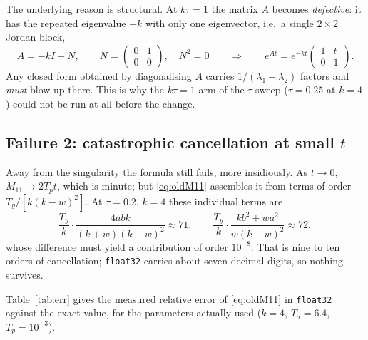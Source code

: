 \documentclass[11pt]{article}
\newcommand{\Tp}{T_p}
\newcommand{\Ta}{T_a}
\newcommand{\kk}{k}
\newcommand{\tauu}{\tau}
\begin{document}
The underlying reason is structural. At $\kk\tauu=1$ the matrix $A$ becomes
\emph{defective}: it has the repeated eigenvalue $-\kk$ with only one eigenvector, i.e.\ a
single $2\times2$ Jordan block,
\begin{equation}
A = -\kk I + N,\qquad N=\begin{pmatrix}0&1\\0&0\end{pmatrix},\quad N^{2}=0
\qquad\Longrightarrow\qquad
e^{At} = e^{-\kk t}\begin{pmatrix}1 & t\\ 0 & 1\end{pmatrix}.
\label{eq:jordan}
\end{equation}
Any closed form obtained by diagonalising $A$ carries $1/(\lambda_1-\lambda_2)$ factors and
\emph{must} blow up there. This is why the $\kk\tauu=1$ arm of the $\tauu$ sweep
($\tauu=0.25$ at $\kk=4$) could not be run at all before the change.

\subsection{Failure 2: catastrophic cancellation at small $t$}

Away from the singularity the formula still fails, more insidiously. As $t\to0$,
$M_{11}\to 2\Tp t$, which is minute; but \eqref{eq:oldM11} assembles it from terms of order
$T_y/[\kk(\kk-w)^{2}]$. At $\tauu=0.2$, $\kk=4$ these individual terms are
\begin{equation}
\frac{T_y}{\kk}\cdot\frac{4abk}{(\kk+w)(\kk-w)^{2}} \approx 71,
\qquad
\frac{T_y}{\kk}\cdot\frac{\kk b^{2}+wa^{2}}{w(\kk-w)^{2}} \approx 72,
\end{equation}
whose difference must yield a contribution of order $10^{-8}$. That is nine to ten orders
of cancellation; \texttt{float32} carries about seven decimal digits, so nothing survives.

Table~\ref{tab:err} gives the measured relative error of \eqref{eq:oldM11} in
\texttt{float32} against the exact value, for the parameters actually used
($\kk=4$, $\Ta=6.4$, $\Tp=10^{-3}$).
\end{document}
